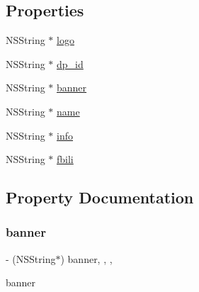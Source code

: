 \subsection*{Properties}
\begin{DoxyCompactItemize}
\item 
N\+S\+String $\ast$ \mbox{\hyperlink{interface_j_m_brand_detail_info_model_af79a9403a9b8ba53886d2c13eb755c21}{logo}}
\item 
N\+S\+String $\ast$ \mbox{\hyperlink{interface_j_m_brand_detail_info_model_ac3fd84d12fe5e4956370581e7c15eb8d}{dp\+\_\+id}}
\item 
N\+S\+String $\ast$ \mbox{\hyperlink{interface_j_m_brand_detail_info_model_ac8c375f571f57e9aa8cac4d080aa46ec}{banner}}
\item 
N\+S\+String $\ast$ \mbox{\hyperlink{interface_j_m_brand_detail_info_model_aa73468ebf7e52379037a946ce0d2f605}{name}}
\item 
N\+S\+String $\ast$ \mbox{\hyperlink{interface_j_m_brand_detail_info_model_a724b3e2e917f84585fb01d43c2b4c39a}{info}}
\item 
N\+S\+String $\ast$ \mbox{\hyperlink{interface_j_m_brand_detail_info_model_ae7bac44e3dd7f6724823326b542f748a}{fbili}}
\end{DoxyCompactItemize}


\subsection{Property Documentation}
\mbox{\label{interface_j_m_brand_detail_info_model_ac8c375f571f57e9aa8cac4d080aa46ec}} 
\subsubsection{\texorpdfstring{banner}{banner}}
{\footnotesize\ttfamily -\/ (N\+S\+String$\ast$) banner\hspace{0.3cm}{\ttfamily [read]}, {\ttfamily [write]}, {\ttfamily [nonatomic]}, {\ttfamily [copy]}}

banner \mbox{\label{interface_j_m_brand_detail_info_model_ac3fd84d12fe5e4956370581e7c15eb8d}} 
